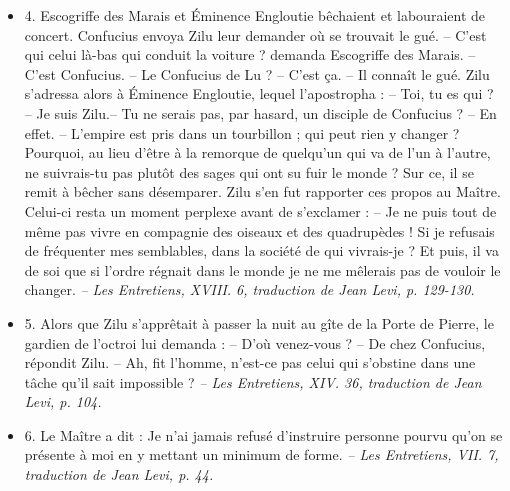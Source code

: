 \begin{itemize}
\item 4. \newline Escogriffe des Marais  et Éminence Engloutie bêchaient et labouraient de concert. Confucius envoya Zilu leur demander où se trouvait le gué. \newline -- C’est qui celui là-bas qui conduit la voiture ? demanda Escogriffe des Marais. \newline -- C’est Confucius. \newline -- Le Confucius de Lu ? \newline -- C’est ça. \newline -- Il connaît le gué.  \newline Zilu s’adressa alors à Éminence Engloutie, lequel l’apostropha :  \newline -- Toi, tu es qui ? \newline -- Je suis Zilu.\newline  -- Tu ne serais pas, par hasard, un disciple de Confucius ? \newline -- En effet.  \newline -- L’empire est pris dans un tourbillon ; qui peut rien y changer ? Pourquoi, au lieu d’être à la remorque de quelqu’un qui va de l’un à l’autre, ne suivrais-tu pas plutôt des sages qui ont su fuir le monde ? \newline  Sur ce, il se remit à bêcher sans désemparer. Zilu s’en fut rapporter ces propos au Maître. Celui-ci resta un moment perplexe avant de s’exclamer :  \newline  -- Je ne puis tout de même pas vivre en compagnie des oiseaux et des quadrupèdes ! Si je refusais de fréquenter mes semblables, dans la société de qui vivrais-je ? Et puis, il va de soi que si l’ordre régnait dans le monde je ne me mêlerais pas de vouloir le changer.  \textit{\small -- Les Entretiens, XVIII. 6, traduction de Jean Levi, p. 129-130.  }

\item 5. \newline Alors que Zilu s’apprêtait à passer la nuit au gîte de la Porte de Pierre, le gardien de l’octroi lui demanda : \newline-- D’où venez-vous ? \newline -- De chez Confucius, répondit Zilu. \newline-- Ah, fit l’homme, n’est-ce pas celui qui s’obstine dans une tâche qu’il sait impossible ?  \textit{\small -- Les Entretiens, XIV. 36, traduction de Jean Levi, p. 104.  }
\item 6. \newline Le Maître a dit : Je n’ai jamais refusé d’instruire personne pourvu qu’on se présente à moi en y mettant un minimum de forme. \textit{\small -- Les Entretiens, VII. 7, traduction de Jean Levi, p. 44.   
}
\end{itemize}
